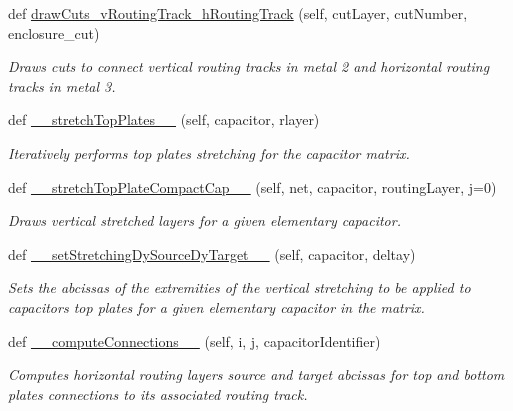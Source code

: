 \begin{DoxyCompactItemize}
def \mbox{\hyperlink{classpython_1_1capacitorrouted_1_1RoutMatchedCapacitor_a7fc53fb348bcaf52180b6cba1e570152}{draw\+Cuts\+\_\+v\+Routing\+Track\+\_\+h\+Routing\+Track}} (self, cut\+Layer, cut\+Number, enclosure\+\_\+cut)
\begin{DoxyCompactList}\small\item\em Draws cuts to connect vertical routing tracks in metal 2 and horizontal routing tracks in metal 3. \end{DoxyCompactList}\item 
def \mbox{\hyperlink{classpython_1_1capacitorrouted_1_1RoutMatchedCapacitor_a933728945d2d4a9d641ef93bf669d3b1}{\+\_\+\+\_\+stretch\+Top\+Plates\+\_\+\+\_\+}} (self, capacitor, rlayer)
\begin{DoxyCompactList}\small\item\em Iteratively performs top plates stretching for the capacitor matrix. \end{DoxyCompactList}\item 
def \mbox{\hyperlink{classpython_1_1capacitorrouted_1_1RoutMatchedCapacitor_adc7e5eab8f957ba5f80dd1e0d0ff1e50}{\+\_\+\+\_\+stretch\+Top\+Plate\+Compact\+Cap\+\_\+\+\_\+}} (self, net, capacitor, routing\+Layer, j=0)
\begin{DoxyCompactList}\small\item\em Draws vertical stretched layers for a given elementary capacitor. \end{DoxyCompactList}\item 
def \mbox{\hyperlink{classpython_1_1capacitorrouted_1_1RoutMatchedCapacitor_a502017c18e8b268a07ff7f861dfb0e20}{\+\_\+\+\_\+set\+Stretching\+Dy\+Source\+Dy\+Target\+\_\+\+\_\+}} (self, capacitor, deltay)
\begin{DoxyCompactList}\small\item\em Sets the abcissas of the extremities of the vertical stretching to be applied to capacitor\textquotesingle{}s top plates for a given elementary capacitor in the matrix. \end{DoxyCompactList}\item 
def \mbox{\hyperlink{classpython_1_1capacitorrouted_1_1RoutMatchedCapacitor_ab7dd108892c643c3cc0a5b3118152097}{\+\_\+\+\_\+compute\+Connections\+\_\+\+\_\+}} (self, i, j, capacitor\+Identifier)
\begin{DoxyCompactList}\small\item\em Computes horizontal routing layers source and target abcissas for top and bottom plates connections to its associated routing track. \end{DoxyCompactList}\end{DoxyCompactItemize}


